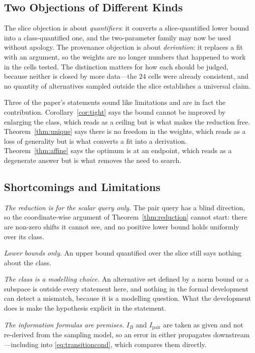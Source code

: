 \subsection{Two Objections of Different Kinds}

The slice objection is about \emph{quantifiers}: it converts a slice-quantified lower bound
into a class-quantified one, and the two-parameter family may now be used without apology.
The provenance objection is about \emph{derivation}: it replaces a fit with an argument, so
the weights are no longer numbers that happened to work in the cells tested. The distinction
matters for how each should be judged, because neither is closed by more data---the $24$ cells
were already consistent, and no quantity of alternatives sampled outside the slice
establishes a universal claim.

Three of the paper's statements sound like limitations and are in fact the contribution.
Corollary~\ref{cor:tight} says the bound cannot be improved by enlarging the class, which
reads as a ceiling but is what makes the reduction free. Theorem~\ref{thm:unique} says there
is no freedom in the weights, which reads as a loss of generality but is what converts a fit
into a derivation. Theorem~\ref{thm:affine} says the optimum is at an endpoint, which reads
as a degenerate answer but is what removes the need to search.

\subsection{Shortcomings and Limitations}

\emph{The reduction is for the scalar query only.} The pair query has a blind direction, so
the coordinate-wise argument of Theorem~\ref{thm:reduction} cannot start: there are non-zero
shifts it cannot see, and no positive lower bound holds uniformly over its class.

\emph{Lower bounds only.} An upper bound quantified over the slice still says nothing about
the class.

\emph{The class is a modelling choice.} An alternative set defined by a norm bound or a
subspace is outside every statement here, and nothing in the formal development can detect a
mismatch, because it is a modelling question. What the development does is make the
hypothesis explicit in the statement.

\emph{The information formulas are premises.} $I_{B}$ and $I_{\mathrm{pair}}$ are taken as
given and not re-derived from the sampling model, so an error in either propagates
downstream---including into \eqref{eq:transitioncond}, which compares them directly.

